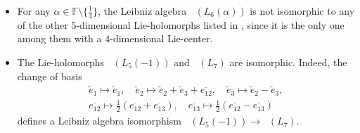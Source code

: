 \documentclass[11pt,a4paper]{amsart}
\theoremstyle{plain}
\theoremstyle{definition}
\theoremstyle{remark}
\numberwithin{equation}{section}
\newcommand{\0}{\emptyset}
\newcommand{\bF}{\mathbb{F}}
\DeclareMathOperator{\holL}{hol_{Lie}}
\newcommand{\ov}[1]{\overline{#1}}
\begin{document}
\begin{itemize}[itemsep=0.35em]
	\item For any $\alpha\in\bF \setminus \lbrace \tfrac{1}{4} \rbrace$, the Leibniz algebra $\holL(L_6(\alpha))$ is not isomorphic to any of the other $5$-dimensional Lie-holomorphs listed in , since it is the only one among them with a $4$-dimensional Lie-center.
	      
	\item The Lie-holomorphs $\holL(L_5(-1))$ and $\holL(L_7)$ are isomorphic. Indeed, the change of basis
	      \begin{gather*}
	      	\widetilde{e}_1 \mapsto \widetilde{e}_1, \quad \widetilde{e}_2 \mapsto \widetilde{e}_2+\widetilde{e}_3+\ov{e_{12}}, \quad \widetilde{e}_3 \mapsto \widetilde{e}_2-\widetilde{e}_3, \\
	      	\ov{e_{12}} \mapsto \frac{1}{2}(\ov{e_{12}}+\ov{e_{13}}), \quad \ov{e_{13}} \mapsto \frac{1}{2}(\ov{e_{12}}-\ov{e_{13}})  
	      \end{gather*}
	      defines a Leibniz algebra isomorphism $\holL(L_5(-1)) \to \holL(L_7)$.
	      

\end{itemize}
\end{document}
